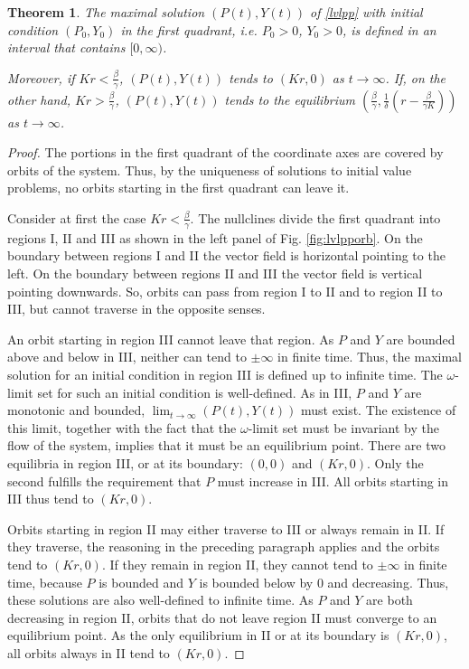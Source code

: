 \documentclass[12pt]{article}
\newtheorem{theorem}{Theorem}[section]
\theoremstyle{definition}
\begin{document}
\begin{theorem}  \label{thlvlpp}
	The maximal solution $(P(t),Y(t))$ of \eqref{lvlpp} with initial condition $(P_0,Y_0)$ in the first quadrant, i.e. $P_0>0$, $Y_0>0$, is defined in an interval that contains $[0, \infty)$.    
	
	Moreover, if $Kr< \frac{\beta}{\gamma}$, $(P(t),Y(t))$ tends to $(Kr,0)$ as $t \rightarrow \infty$. If, on the other hand, $Kr> \frac{\beta}{\gamma}$, $(P(t),Y(t))$ tends to the equilibrium $(\frac{\beta}{\gamma}, \frac{1}{\delta}(r- \frac{\beta}{\gamma K}))$ as $t \rightarrow \infty$.
\end{theorem}
\begin{proof}
	The portions in the first quadrant of the coordinate axes are covered by orbits of the system. Thus, by the uniqueness of solutions to initial value problems, no orbits starting in the first quadrant can leave it.
	
	Consider at first the case $Kr< \frac{\beta}{\gamma}$. The nullclines divide the first quadrant into regions I, II and III as shown in the left panel of Fig. \ref{fig:lvlpporb}. On the boundary between regions I and II the vector field is horizontal pointing to the left. On the boundary between regions II and III the vector field is vertical pointing downwards. So, orbits can pass from region I to II and to region II to III, but cannot traverse in the opposite senses.
	
	An orbit starting in region III cannot leave that region. As $P$ and $Y$ are bounded above and below in III, neither can tend to $\pm \infty$ in finite time. Thus, the maximal solution for an initial condition in region III is defined up to infinite time. The $\omega$-limit set for such an initial condition is well-defined. As in III, $P$ and $Y$ are monotonic and bounded, $\lim_{t \rightarrow \infty}(P(t),Y(t))$ must exist. The existence of this limit, together with the fact that the $\omega$-limit set must be invariant by the flow of the system, implies that it must be an equilibrium point. There are two equilibria in region III, or at its boundary: $(0,0)$ and $(Kr,0)$. Only the second fulfills the requirement that $P$ must increase in III. All orbits starting in III thus tend to $(Kr,0)$.
	
	Orbits starting in region II may either traverse to III or always remain in II. If they traverse, the reasoning in the preceding paragraph applies and the orbits tend to $(Kr,0)$. If they remain in region II, they cannot tend to $\pm \infty$ in finite time, because $P$ is bounded and $Y$ is bounded below by 0 and decreasing. Thus, these solutions are also well-defined to infinite time. As $P$ and $Y$ are both decreasing in region II, orbits that do not leave region II must converge to an equilibrium point. As the only equilibrium in II or at its boundary is $(Kr,0)$, all orbits always in II tend to $(Kr,0)$.
	

\end{proof}
\end{document}
